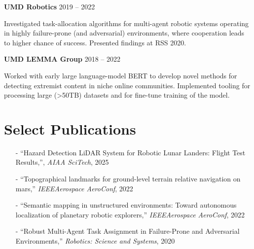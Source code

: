 \documentclass[letterpaper,11pt]{article}
\begin{document}
\begin{minipage}[t]{0.42\textwidth}
  \noindent
  \textbf{UMD Robotics} \hspace{\fill} 2019 -- 2022

  \setlength{\parindent}{15pt}
  {\small Investigated task-allocation algorithms for multi-agent robotic systems operating in highly failure-prone (and adversarial) environments, where cooperation leads to higher chance of success. Presented findings at RSS 2020. }

  \vspace*{6pt}

  \noindent
  \textbf{UMD LEMMA Group} \hspace{\fill} 2018 -- 2022
    
  \setlength{\parindent}{15pt}
  {\small Worked with early large language-model BERT to develop novel methods for detecting extremist content in niche online communities. Implemented tooling for processing large (>50TB) datasets and for fine-tune training of the model. }
\end{minipage}


\section{Select Publications}
\small{
  \begin{itemize}
      \item[-] ``Hazard Detection LiDAR System for Robotic Lunar Landers: Flight Test Results,'', \textit{AIAA SciTech}, 2025

      \item[-] ``Topographical landmarks for ground-level terrain relative navigation on mars,'' \textit{IEEEAerospace AeroConf}, 2022

      \item[-] ``Semantic  mapping in unstructured environments:  Toward autonomous localization of planetary robotic explorers,'' \textit{IEEEAerospace AeroConf}, 2022

      \item[-] ``Robust Multi-Agent Task Assignment in Failure-Prone and Adversarial Environments,'' \textit{Robotics: Science and Systems}, 2020
  \end{itemize} 
}
\end{document}
